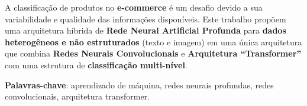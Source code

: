 \begin{resumo}

A classificação de produtos no \textbf{e-commerce} é um desafio devido a sua variabilidade e qualidade das informações disponíveis. Este trabalho propõem uma arquitetura híbrida de \textbf{Rede Neural Artificial Profunda} para \textbf{dados heterogêneos e não estruturados} (texto e imagem) em uma única arquitetura que combina \textbf{Redes Neurais Convolucionais} e \textbf{Arquitetura “Transformer”} com uma estrutura de \textbf{classificação multi-nível}.

\vspace{\onelineskip}
 
\noindent
\textbf{Palavras-chave}: aprendizado de máquina, redes neurais profundas, redes convolucionais, arquitetura transformer.

\end{resumo}